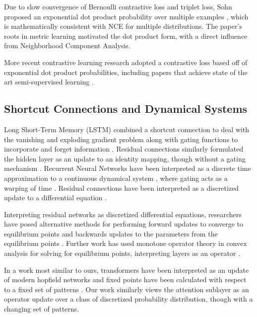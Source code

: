 \documentclass{article}
\begin{document}
Due to slow convergence of Bernoulli contrastive loss and triplet loss, Sohn proposed an exponential dot product probability over multiple examples \cite{Sohn2016ImprovedDM}, which is mathematically consistent with NCE for multiple distributions. The paper’s roots in metric learning motivated the dot product form, with a direct influence from Neighborhood Component Analysis.

More recent contrastive learning research adopted a contrastive loss based off of exponential dot product probabilities, including papers that achieve state of the art semi-supervised learning \cite{wu2018unsupervised,DBLP:journals/corr/abs-2002-05709}.

\subsection{Shortcut Connections and Dynamical Systems}
\label{residual connections}

Long Short-Term Memory (LSTM)  combined a shortcut connection to deal with the vanishing and exploding gradient problem along with gating functions to incorporate and forget information \cite{HochSchm97}. Residual connections similarly formulated the hidden layer as an update to an identity mapping, though without a gating mechanism \cite{he2015deep}. Recurrent Neural Networks have been interpreted as a discrete time approximation to a continuous dynamical system \cite{article}, where gating acts as a warping of time \cite{tallec2018recurrent}. Residual connections have been interpreted as a discretized update to a differential equation \cite{Weinan2017APO,lu2020finite}.

Interpreting residual networks as discretized differential equations, researchers have posed alternative methods for performing forward updates to converge to equilibrium points and backwards updates to the parameters from the equilibrium points \cite{chen2019neural,bai2019deep}. Further work has used monotone operator theory in convex analysis for solving for equilibrium points, interpreting layers as an operator \cite{winston2021monotone}.

In a work most similar to ours, transformers have been interpreted as an update of modern hopfield networks and fixed points have been calculated with respect to a fixed set of patterns \cite{DBLP:journals/corr/abs-2008-02217}.  Our work similarly views the attention sublayer as an operator update over a class of discretized probability distribution, though with a changing set of patterns.
\end{document}
